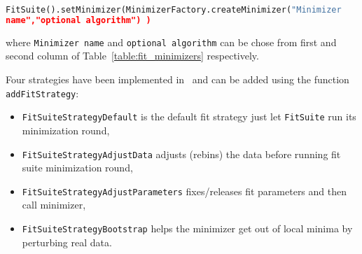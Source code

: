 \begin{lstlisting}[language=python, style=eclipse,numbers=none]
FitSuite().setMinimizer(MinimizerFactory.createMinimizer("Minimizer
name","optional algorithm") )
\end{lstlisting}
where \texttt{Minimizer
name} and \texttt{optional algorithm} can be chose from first and
second column
of Table~\ref{table:fit_minimizers} respectively.

Four strategies have been implemented in \BornAgain\ and can be added
using the function \texttt{addFitStrategy}:
\begin{itemize}
\item \texttt{FitSuiteStrategyDefault} is the default fit strategy
  just let \texttt{FitSuite} run its minimization round,
\item \texttt{FitSuiteStrategyAdjustData} adjusts (rebins) the data before running fit suite minimization round,
\item \texttt{FitSuiteStrategyAdjustParameters} fixes/releases fit parameters and then call minimizer,
\item \texttt{FitSuiteStrategyBootstrap} helps the minimizer get out of local minima by perturbing real data.
\end{itemize}

